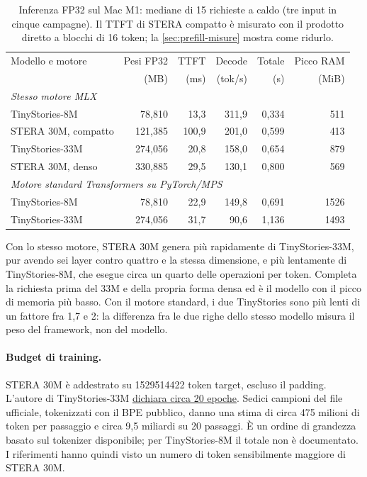 \begin{table}[htbp]
\centering
\small
\begin{tabularx}{\linewidth}{Xrrrrr}
\toprule
Modello e motore & Pesi FP32 & TTFT & Decode & Totale & Picco RAM \\
 & (MB) & (ms) & (tok/s) & (s) & (MiB) \\
\midrule
\multicolumn{6}{l}{\emph{Stesso motore MLX}} \\
TinyStories-8M & 78,810 & 13,3 & 311,9 & 0,334 & 511 \\
STERA 30M, compatto & 121,385 & 100,9 & 201,0 & 0,599 & 413 \\
TinyStories-33M & 274,056 & 20,8 & 158,0 & 0,654 & 879 \\
STERA 30M, denso & 330,885 & 29,5 & 130,1 & 0,800 & 569 \\
\midrule
\multicolumn{6}{l}{\emph{Motore standard Transformers su PyTorch/MPS}} \\
TinyStories-8M & 78,810 & 22,9 & 149,8 & 0,691 & \num{1526} \\
TinyStories-33M & 274,056 & 31,7 & 90,6 & 1,136 & \num{1493} \\
\bottomrule
\end{tabularx}
\caption{Inferenza FP32 sul Mac M1: mediane di 15 richieste a caldo (tre input in cinque campagne). Il TTFT di STERA compatto è misurato con il prodotto diretto a blocchi di 16 token; la \autoref{sec:prefill-misure} mostra come ridurlo.}
\label{tab:tre-checkpoint-ram}
\end{table}

Con lo stesso motore, STERA 30M genera più rapidamente di TinyStories-33M, pur avendo sei layer contro quattro e la stessa dimensione, e più lentamente di TinyStories-8M, che esegue circa un quarto delle operazioni per token. Completa la richiesta prima del 33M e della propria forma densa ed è il modello con il picco di memoria più basso. Con il motore standard, i due TinyStories sono più lenti di un fattore fra 1,7 e 2: la differenza fra le due righe dello stesso modello misura il peso del framework, non del modello.

\paragraph{Budget di training.} STERA 30M è addestrato su \num{1529514422} token target, escluso il padding. L'autore di TinyStories-33M \href{https://huggingface.co/roneneldan/TinyStories-33M/discussions/8}{dichiara circa 20 epoche}. Sedici campioni del file ufficiale, tokenizzati con il BPE pubblico, danno una stima di circa 475 milioni di token per passaggio e circa 9,5 miliardi su 20 passaggi. È un ordine di grandezza basato sul tokenizer disponibile; per TinyStories-8M il totale non è documentato. I riferimenti hanno quindi visto un numero di token sensibilmente maggiore di STERA 30M.

